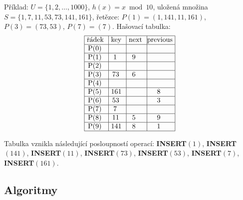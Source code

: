 \documentclass[a4paper,12pt]{article}
\begin{document}
Příklad: $U=\{1,2,\dots,1000\}$, $h(x)=x\bmod10$,\newline 
uložená množina $S=\{1,7,11,53,73,141,161\}$,\newline 
řetězce: $P(1)=(1,141,11,161)$, 
$P(3)=(73,53)$, $P(7)=(7)$.\newline 
Hašovací tabulka:
$$\vtop{\offinterlineskip\halign {\strut\vrule\ # & \vrule\ # & \vrule\ # & \vrule \hfil # \hfil \vrule\cr\noalign{\hrule}řádek & key & next & previous\hfil \cr\noalign{\hrule}P(0) & & & \hfill \cr\noalign{\hrule}P(1) & 1 & 9 & \hfill \cr\noalign{\hrule}P(2) & & & \hfill \cr\noalign{\hrule}P(3) & 73 & 6 & \hfill \cr\noalign{\hrule}P(4) & & &\hfill \cr\noalign{\hrule}P(5) & 161 & & 8 \cr\noalign{\hrule}P(6) & 53 & & 3 \cr\noalign{\hrule}P(7) & 7 & &\hfill \cr\noalign{\hrule}P(8) & 11 & 5 & 9 \cr\noalign{\hrule}P(9) & 141 & 8 & 1 \cr\noalign{\hrule}}}$$

Tabulka vznikla následující posloupností 
operací:\newline 
{\bf INSERT$(1)$}, {\bf INSERT$(141)$}, {\bf INSERT$(11)$}, {\bf INSERT$
(73)$}, 
{\bf INSERT$(53)$},\newline 
{\bf INSERT$(7)$}, {\bf INSERT$(161)$}. 

\subsection{
Algoritmy
}
\end{document}
